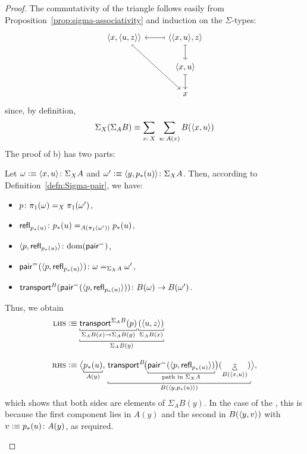 \begin{proof}
    The commutativity of the triangle follows easily from Proposition~\ref{prop:sigma-associativity} and induction on the $\Sigma$-types:
    \[
        \begin{tikzcd}
            \dep{x,\dep{u,z}}
                    \arrow[rdd,mapsto]
                &\dep{\dep{x,u},z}
                    \arrow[l,mapsto]
                    \arrow[d,mapsto]\\
                &\dep{x,u}\arrow[d,mapsto]\\
                &x
        \end{tikzcd}
    \]
    since, by definition,
    \[
        \Sigma_X(\Sigma_AB)\equiv\sum_{x\colon X\vphantom(}\;
            \sum_{u\colon A(x)}B(\dep{x,u})
    \]
    The proof of b) has two parts:
    \begin{description}[font=\normalfont\scshape]
        \item[Type verification.]
        Let $\omega\defeq\dep{x,u}\colon\Sigma_XA$ and $\omega'\defeq\dep{y,p_*(u)}\colon\Sigma_XA$.
        Then, according to Definition~\ref{defn:Sigma-pair}, we have:
        \begin{itemize}
            \item $p\colon\pi_1(\omega)\eq X\pi_1(\omega')$,
            \item $\fun{refl}_{p_*(u)}\colon p_*(u) \eq{A(\pi_1(\omega'))}p_*(u)$,
            \item $\dep{p,\fun{refl}_{p_*(u)}}\colon \dom(\fun{pair}^{\eq{}})$,
            \item $\fun{pair}^{\eq{}}(\dep{p,\fun{refl}_{p_*(u)}}) \colon\omega\eq{\Sigma_XA}\omega'$,
            \item $\fun{transport}^B(\fun{pair}^{\eq{}}(\dep{p, \fun{refl}_{p_*(u)}}))\colon B(\omega)\to B(\omega')$.
        \end{itemize}
        Thus, we obtain
        \begin{align*}
            \lhs&\defeq\explain[\Sigma_AB(y)]
                {\explain[\Sigma_AB(x)\to\Sigma_AB(y)]
                    {\fun{transport}^{\Sigma_AB}(p)}
                \explain[\Sigma_AB(x)]
                    {(\dep{u,z})}}\\[3mm]
            \rhs&\defeq\bigdep{
                \explain[A(y)]{p_*(u)},\,
                \explain[B(\dep{y,p_*(u)})]{
                    \fun{transport}^B\!
                    \bigl(
                    \explain[\text{path in }\Sigma_XA]
                    {\fun{pair}^{\eq{}}(\dep{p,\fun{refl}_{p_*(u)}})}
                    \bigr)
                    (\explain[B(\dep{x,u})]{z})
                }
            },
        \end{align*}
        which shows that both sides are elements of $\Sigma_AB(y)$. In the case of the \rhs, this is because the first component lies in $A(y)$ and the second in $B(\langle y,v\rangle)$ with $v \defeq p_*(u)\colon A(y)$, as required.


\end{description}
\end{proof}
